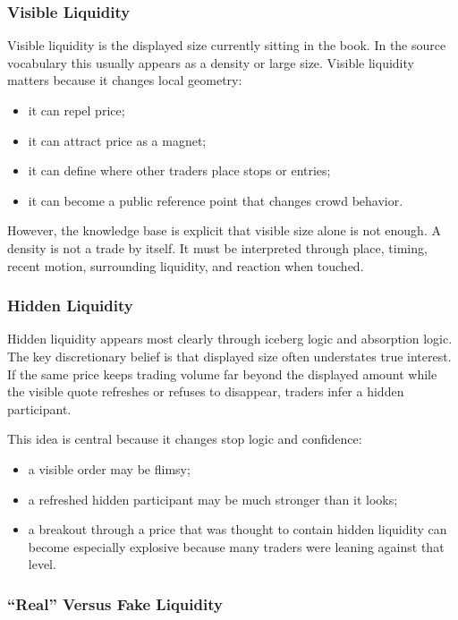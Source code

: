 \subsubsection{Visible Liquidity}

Visible liquidity is the displayed size currently sitting in the book.
In the source vocabulary this usually appears as a density or large size.
Visible liquidity matters because it changes local geometry:
\begin{itemize}
  \item it can repel price;
  \item it can attract price as a magnet;
  \item it can define where other traders place stops or entries;
  \item it can become a public reference point that changes crowd behavior.
\end{itemize}

However, the knowledge base is explicit that visible size alone is not enough.
A density is not a trade by itself.
It must be interpreted through place, timing, recent motion, surrounding liquidity, and reaction when touched.

\subsubsection{Hidden Liquidity}

Hidden liquidity appears most clearly through iceberg logic and absorption logic.
The key discretionary belief is that displayed size often understates true interest.
If the same price keeps trading volume far beyond the displayed amount while the visible quote refreshes or refuses to disappear, traders infer a hidden participant.

This idea is central because it changes stop logic and confidence:
\begin{itemize}
  \item a visible order may be flimsy;
  \item a refreshed hidden participant may be much stronger than it looks;
  \item a breakout through a price that was thought to contain hidden liquidity can become especially explosive because many traders were leaning against that level.
\end{itemize}

\subsubsection{``Real'' Versus Fake Liquidity}


